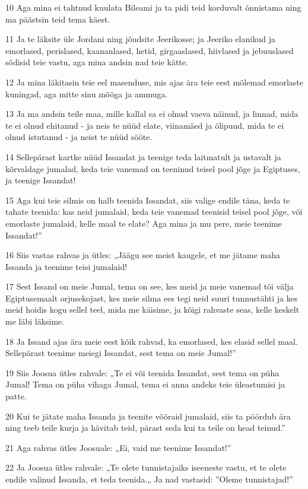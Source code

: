 \par 10 Aga mina ei tahtnud kuulata Bileami ja ta pidi teid korduvalt õnnistama ning ma päästsin teid tema käest.
\par 11 Ja te läksite üle Jordani ning jõudsite Jeerikosse; ja Jeeriko elanikud ja emorlased, perislased, kaananlased, hetid, girgaaslased, hiivlased ja jebuuslased sõdisid teie vastu, aga mina andsin nad teie kätte.
\par 12 Ja mina läkitasin teie eel masenduse, mis ajas ära teie eest mõlemad emorlaste kuningad, aga mitte sinu mõõga ja ammuga.
\par 13 Ja ma andsin teile maa, mille kallal sa ei olnud vaeva näinud, ja linnad, mida te ei olnud ehitanud - ja neis te nüüd elate, viinamäed ja õlipuud, mida te ei olnud istutanud - ja neist te nüüd sööte.
\par 14 Sellepärast kartke nüüd Issandat ja teenige teda laitmatult ja ustavalt ja kõrvaldage jumalad, keda teie vanemad on teeninud teisel pool jõge ja Egiptuses, ja teenige Issandat!
\par 15 Aga kui teie silmis on halb teenida Issandat, siis valige endile täna, keda te tahate teenida: kas neid jumalaid, keda teie vanemad teenisid teisel pool jõge, või emorlaste jumalaid, kelle maal te elate? Aga mina ja mu pere, meie teenime Issandat!”
\par 16 Siis vastas rahvas ja ütles: „Jäägu see meist kaugele, et me jätame maha Issanda ja teenime teisi jumalaid!
\par 17 Sest Issand on meie Jumal, tema on see, kes meid ja meie vanemad tõi välja Egiptusemaalt orjusekojast, kes meie silma ees tegi neid suuri tunnustähti ja kes meid hoidis kogu sellel teel, mida me käisime, ja kõigi rahvaste seas, kelle keskelt me läbi läksime.
\par 18 Ja Issand ajas ära meie eest kõik rahvad, ka emorlased, kes elasid sellel maal. Sellepärast teenime meiegi Issandat, sest tema on meie Jumal!”
\par 19 Siis Joosua ütles rahvale: „Te ei või teenida Issandat, sest tema on püha Jumal! Tema on püha vihaga Jumal, tema ei anna andeks teie üleastumisi ja patte.
\par 20 Kui te jätate maha Issanda ja teenite võõraid jumalaid, siis ta pöördub ära ning teeb teile kurja ja hävitab teid, pärast seda kui ta teile on head teinud.”
\par 21 Aga rahvas ütles Joosuale: „Ei, vaid me teenime Issandat!”
\par 22 Ja Joosua ütles rahvale: „Te olete tunnistajaiks iseeneste vastu, et te olete endile valinud Issanda, et teda teenida.„ Ja nad vastasid: ”Oleme tunnistajad!”
